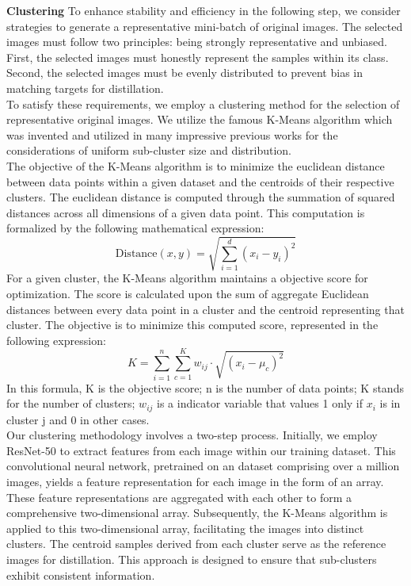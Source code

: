 \documentclass[sigconf, nonacm]{acmart}
\begin{document}
\textbf{Clustering}
To enhance stability and efficiency in the following step, we consider strategies to generate a representative mini-batch of original images. The selected images must follow two principles: being strongly representative and unbiased. First, the selected images must honestly represent the samples within its class. Second, the selected images must be evenly distributed to prevent bias in matching targets for distillation. \\
To satisfy these requirements, we employ a clustering method for the selection of representative original images. We utilize the famous K-Means algorithm which was invented and utilized in many impressive previous works\cite{forgy1965cluster} \cite{arthur2007k} \cite{Omer_fast-pytorch-kmeans_2020} for the considerations of uniform sub-cluster size and distribution. \\
The objective of the K-Means algorithm is to minimize the euclidean distance between data points within a given dataset and the centroids of their respective clusters. The euclidean distance  is computed through the summation of squared distances across all dimensions of a given data point. This computation is formalized by the following mathematical expression:
\begin{equation*}
\text{Distance}(x, y) = \sqrt{\sum_{i=1}^{d}(x_i - y_i)^2}
\end{equation*}
For a given cluster, the K-Means algorithm maintains a objective score for optimization. The score is calculated upon the sum of aggregate Euclidean distances between every data point in a cluster and the centroid representing that cluster. The objective is to minimize this computed score, represented in the following expression:
\begin{equation*}
K = \sum_{i=1}^{n} \sum_{c=1}^{K} w_{ij} \cdot \sqrt{(x_i - \mu_c)^2}
\end{equation*}
In this formula, K is the objective score; n is the number of data points; K stands for the number of clusters; 
\begin{math}
w_{ij}
\end{math}
is a indicator variable that values 1 only if 
\begin{math}
x_{i}
\end{math}
is in cluster j and 0 in other cases.\\
Our clustering methodology involves a two-step process. Initially, we employ ResNet-50 to extract features from each image within our training dataset. This convolutional neural network, pretrained on an dataset comprising over a million images, yields a feature representation for each image in the form of an array. These feature representations are  aggregated with each other to form a comprehensive two-dimensional array. Subsequently, the K-Means algorithm is applied to this two-dimensional array, facilitating the images into distinct clusters. The centroid samples derived from each cluster serve as the reference images for distillation. This approach is designed to ensure that sub-clusters exhibit consistent information.
\end{document}
